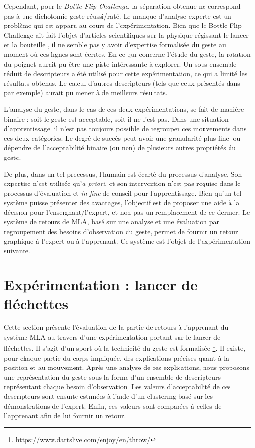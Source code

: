 Cependant, pour le \textit{Bottle Flip Challenge}, la séparation obtenue ne correspond pas à une dichotomie geste réussi/raté. Le manque d'analyse experte est un problème qui est apparu au cours de l'expérimentation. Bien que le Bottle Flip Challenge ait fait l'objet d'articles scientifiques sur la physique régissant le lancer et la bouteille \parencite{Dekker2018BF, BFCAnalysis}, il ne semble pas y avoir d'expertise formalisée du geste au moment où ces lignes sont écrites. En ce qui concerne l'étude du geste, la rotation du poignet aurait pu être une piste intéressante à explorer. Un sous-ensemble réduit de descripteurs a été utilisé pour cette expérimentation, ce qui a limité les résultats obtenus. Le calcul d'autres descripteurs (tels que ceux présentés dans \parencite{larboulette2015Descriptors} par exemple) aurait pu mener à de meilleurs résultats.

L'analyse du geste, dans le cas de ces deux expérimentations, se fait de manière binaire : soit le geste est acceptable, soit il ne l'est pas. Dans une situation d'apprentissage, il n'est pas toujours possible de regrouper ces mouvements dans ces deux catégories. Le degré de succès peut avoir une granularité plus fine, ou dépendre de l'acceptabilité binaire (ou non) de plusieurs autres propriétés du geste.

De plus, dans un tel processus, l'humain est écarté du processus d'analyse. Son expertise n'est utilisée qu'\textit{a priori}, et son intervention n'est pas requise dans le processus d'évaluation et \textit{in fine} de conseil pour l'apprentissage. Bien qu'un tel système puisse présenter des avantages, l'objectif est de proposer une aide à la décision pour l'enseignant/l'expert, et non pas un remplacement de ce dernier. Le système de retours de MLA, basé sur une analyse et une évaluation par regroupement des besoins d'observation du geste, permet de fournir un retour graphique à l'expert ou à l'apprenant. Ce système est l'objet de l'expérimentation suivante.

\section{Expérimentation : lancer de fléchettes}
Cette section présente l'évaluation de la partie de retours à l'apprenant du système MLA au travers d'une expérimentation portant sur le lancer de fléchettes. Il s'agit d'un sport où la technicité du geste est formalisée \footnote{\url{https://www.dartslive.com/enjoy/en/throw/}}. Il existe, pour chaque partie du corps impliquée, des explications précises quant à la position et au mouvement. Après une analyse de ces explications, nous proposons une représentation du geste sous la forme d'un ensemble de descripteurs représentant chaque besoin d'observation. Les valeurs d'acceptabilité de ces descripteurs sont ensuite estimées à l'aide d'un clustering basé sur les démonstrations de l'expert. Enfin, ces valeurs sont comparées à celles de l'apprenant afin de lui fournir un retour.

